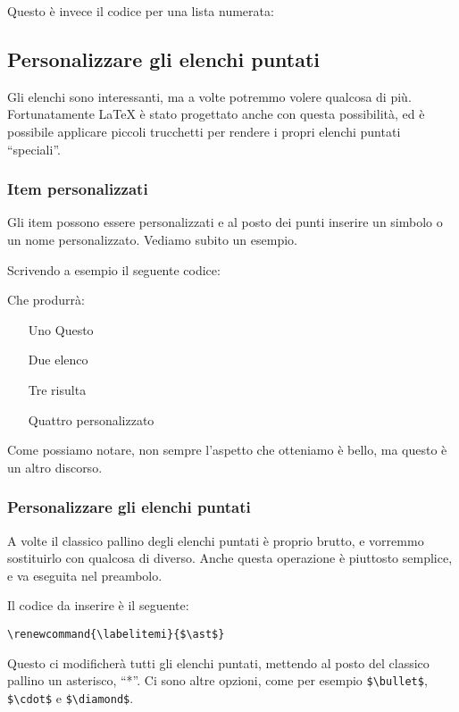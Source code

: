 \noindent Questo è invece il codice per una lista numerata:


\subsection{Personalizzare gli elenchi puntati}

Gli elenchi sono interessanti, ma a volte potremmo volere qualcosa di più. 
Fortunatamente \LaTeX{} è stato progettato anche con questa possibilità, ed è 
possibile applicare piccoli trucchetti per rendere i propri elenchi puntati 
``speciali''.

\subsubsection{Item personalizzati}

Gli item possono essere personalizzati e al posto dei punti inserire un simbolo 
o un nome personalizzato. Vediamo subito un esempio.

Scrivendo a esempio il seguente codice:



\vspace{\abovedisplayskip}

\begin{minipage}{\linewidth}
  Che produrrà:

  \begin{itemize}
    \item[Uno] Questo
    \item[Due] elenco
    \item[Tre] risulta
    \item[Quattro] personalizzato
  \end{itemize} 
 
\end{minipage}

\vspace{\belowdisplayskip}


\noindent Come possiamo notare, non sempre l'aspetto che otteniamo è bello, ma 
questo è un altro discorso.

\subsubsection{Personalizzare gli elenchi puntati}

A volte il classico pallino degli elenchi puntati è proprio brutto, e vorremmo 
sostituirlo con qualcosa di diverso.
Anche questa operazione è piuttosto semplice, e va eseguita nel preambolo.

\noindent Il codice da inserire è il seguente:

\verb!\renewcommand{\labelitemi}{$\ast$}!

\noindent Questo ci modificherà tutti gli elenchi puntati, mettendo al posto 
del classico pallino un asterisco, ``*''. Ci sono altre opzioni, come per 
esempio \verb!$\bullet$!, \verb!$\cdot$! e \verb!$\diamond$!.

